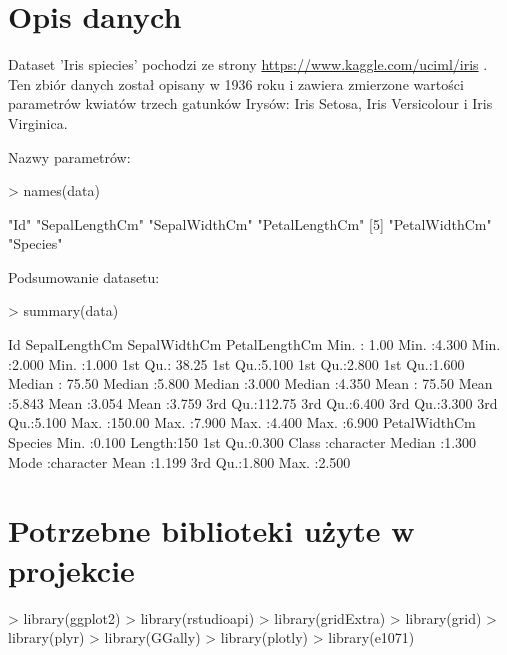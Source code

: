 \documentclass{article}
\begin{document}
\section{Opis danych}

Dataset 'Iris spiecies' pochodzi ze strony \url{https://www.kaggle.com/uciml/iris} . Ten zbiór danych został opisany w 1936 roku i zawiera zmierzone wartości parametrów kwiatów trzech gatunków Irysów: Iris Setosa, Iris Versicolour i Iris Virginica.


\vspace{0.2cm}
Nazwy parametrów:

\begin{Schunk}
\begin{Sinput}
> names(data)
\end{Sinput}
\begin{Soutput}
[1] "Id"            "SepalLengthCm" "SepalWidthCm"  "PetalLengthCm"
[5] "PetalWidthCm"  "Species"      
\end{Soutput}
\end{Schunk}


Podsumowanie datasetu:

\begin{Schunk}
\begin{Sinput}
> summary(data)
\end{Sinput}
\begin{Soutput}
       Id         SepalLengthCm    SepalWidthCm   PetalLengthCm  
 Min.   :  1.00   Min.   :4.300   Min.   :2.000   Min.   :1.000  
 1st Qu.: 38.25   1st Qu.:5.100   1st Qu.:2.800   1st Qu.:1.600  
 Median : 75.50   Median :5.800   Median :3.000   Median :4.350  
 Mean   : 75.50   Mean   :5.843   Mean   :3.054   Mean   :3.759  
 3rd Qu.:112.75   3rd Qu.:6.400   3rd Qu.:3.300   3rd Qu.:5.100  
 Max.   :150.00   Max.   :7.900   Max.   :4.400   Max.   :6.900  
  PetalWidthCm     Species         
 Min.   :0.100   Length:150        
 1st Qu.:0.300   Class :character  
 Median :1.300   Mode  :character  
 Mean   :1.199                     
 3rd Qu.:1.800                     
 Max.   :2.500                     
\end{Soutput}
\end{Schunk}

\section{Potrzebne biblioteki użyte w projekcie}
\begin{Schunk}
\begin{Sinput}
> library(ggplot2)
> library(rstudioapi)
> library(gridExtra)
> library(grid)
> library(plyr)
> library(GGally)
> library(plotly)
> library(e1071)
\end{Sinput}
\end{Schunk}
\end{document}
